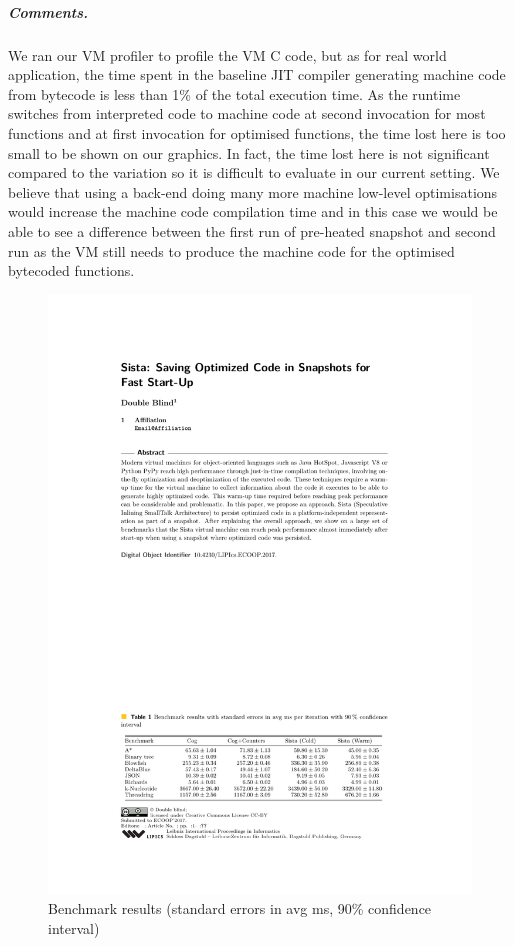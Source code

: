 \documentclass[a4paper,12pt,twoside]{../includes/ThesisStyle}
\begin{document}
\subparagraph{Comments.}

We ran our VM profiler to profile the VM C code, but as for real world application, the time spent in the baseline JIT compiler generating machine code from bytecode is less than 1\% of the total execution time. As the runtime switches from interpreted code to machine code at second invocation for most functions and at first invocation for optimised functions, the time lost here is too small to be shown on our graphics. In fact, the time lost here is not significant compared to the variation so it is difficult to evaluate in our current setting. We believe that using a back-end doing many more machine low-level optimisations would increase the machine code compilation time and in this case we would be able to see a difference between the first run of pre-heated snapshot and second run as the VM still needs to produce the machine code for the optimised bytecoded functions.

\begin{figure}[h!]
    \begin{center}
        \includegraphics[width=\linewidth]{BenchTable}
        \caption{Benchmark results (standard errors in avg ms, 90\% confidence interval)}
        \label{tbl:benchmark}
    \end{center}
\end{figure}
\end{document}
